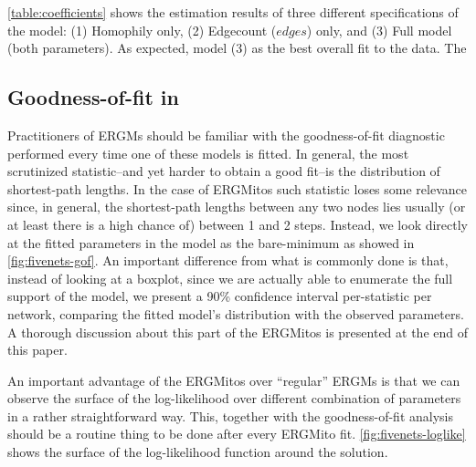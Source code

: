 \documentclass[12pt]{article}
\begin{document}
\autoref{table:coefficients} shows the estimation results of three different specifications of the model: (1) Homophily only, (2) Edgecount ($edges$) only, and (3) Full model (both parameters). As expected, model (3) as the best overall fit to the data. The 



\subsection{Goodness-of-fit in \ergmitos}

Practitioners of ERGMs should be familiar with the goodness-of-fit diagnostic performed every time one of these models is fitted. In general, the most scrutinized statistic--and yet harder to obtain a good fit--is the distribution of shortest-path lengths. In the case of ERGMitos such statistic loses some relevance since, in general, the shortest-path lengths between any two nodes lies usually (or at least there is a high chance of) between 1 and 2 steps. Instead, we look directly at the fitted parameters in the model as the bare-minimum as showed in \autoref{fig:fivenets-gof}. An important difference from what is commonly done is that, instead of looking at a boxplot, since we are actually able to enumerate the full support of the model, we present a 90\% confidence interval per-statistic per network, comparing the fitted model's distribution with the observed parameters. A thorough discussion about this part of the ERGMitos is presented at the end of this paper.

An important advantage of the ERGMitos over ``regular'' ERGMs is that we can observe the surface of the log-likelihood over different combination of parameters in a rather straightforward way. This, together with the goodness-of-fit analysis should be a routine thing to be done after every ERGMito fit. \autoref{fig:fivenets-loglike} shows the surface of the log-likelihood function around the solution.
\end{document}
